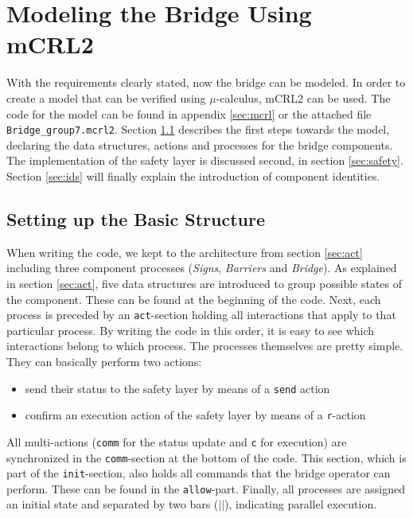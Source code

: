 \section{Modeling the Bridge Using mCRL2}
\label{sec:model}

With the requirements clearly stated, now the bridge can be modeled. In order to create a model that can be verified using $\mu$-calculus, mCRL2 can be used. The code for the model can be found in appendix \ref{sec:mcrl} or the attached file \texttt{Bridge\_group7.mcrl2}. Section \ref{sec:basic} describes the first steps towards the model, declaring the data structures, actions and processes for the bridge components. The implementation of the safety layer is discussed second, in section \ref{sec:safety}. Section \ref{sec:ids} will finally explain the introduction of component identities.

\subsection{Setting up the Basic Structure}
\label{sec:basic}
When writing the code, we kept to the architecture from section \ref{sec:act} including three component processes (\emph{Signs}, \emph{Barriers} and \emph{Bridge}). As explained in section \ref{sec:act}, five data structures are introduced to group possible states of the component. These can be found at the beginning of the code. Next, each process is preceded by an \texttt{act}-section holding all interactions that apply to that particular process. By writing the code in this order, it is easy to see which interactions belong to which process. The processes themselves are pretty simple. They can basically perform two actions:
%
\begin{itemize}
	\item send their status to the safety layer by means of a \texttt{send} action
	\item confirm an execution action of the safety layer by means of a \texttt{r}-action
\end{itemize}
%
All multi-actions (\texttt{comm} for the status update and \texttt{c} for execution) are synchronized in the \texttt{comm}-section at the bottom of the code. This section, which is part of the \texttt{init}-section, also holds all commands that the bridge operator can perform. These can be found in the \texttt{allow}-part. Finally, all processes are assigned an initial state and separated by two bars ($||$), indicating parallel execution.

